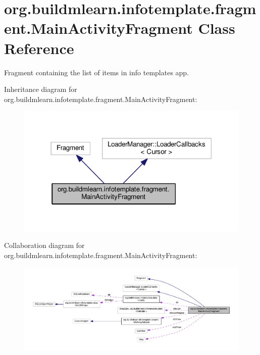 \hypertarget{classorg_1_1buildmlearn_1_1infotemplate_1_1fragment_1_1MainActivityFragment}{}\section{org.\+buildmlearn.\+infotemplate.\+fragment.\+Main\+Activity\+Fragment Class Reference}
\label{classorg_1_1buildmlearn_1_1infotemplate_1_1fragment_1_1MainActivityFragment}


Fragment containing the list of items in info template\textquotesingle{}s app.  




Inheritance diagram for org.\+buildmlearn.\+infotemplate.\+fragment.\+Main\+Activity\+Fragment\+:
\nopagebreak
\begin{figure}[H]
\begin{center}
\leavevmode
\includegraphics[width=318pt]{classorg_1_1buildmlearn_1_1infotemplate_1_1fragment_1_1MainActivityFragment__inherit__graph}
\end{center}
\end{figure}


Collaboration diagram for org.\+buildmlearn.\+infotemplate.\+fragment.\+Main\+Activity\+Fragment\+:
\nopagebreak
\begin{figure}[H]
\begin{center}
\leavevmode
\includegraphics[width=350pt]{classorg_1_1buildmlearn_1_1infotemplate_1_1fragment_1_1MainActivityFragment__coll__graph}
\end{center}
\end{figure}
